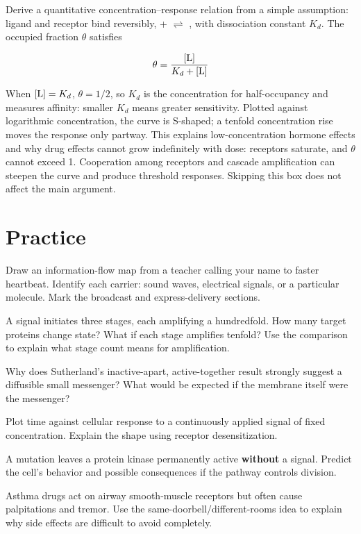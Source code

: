 \begin{tiaozhan}
Derive a quantitative concentration--response relation from a simple assumption: ligand  and receptor  bind reversibly,  +  $\rightleftharpoons$ , with dissociation constant $K_d$. The occupied fraction $\theta$ satisfies

\[\theta = \frac{[\mathrm{L}]}{K_d + [\mathrm{L}]}\]

When $[\mathrm{L}] = K_d$, $\theta = 1/2$, so $K_d$ is the concentration for half-occupancy and measures affinity: smaller $K_d$ means greater sensitivity. Plotted against logarithmic concentration, the curve is S-shaped; a tenfold concentration rise moves the response only partway. This explains low-concentration hormone effects and why drug effects cannot grow indefinitely with dose: receptors saturate, and $\theta$ cannot exceed 1. Cooperation among receptors and cascade amplification can steepen the curve and produce threshold responses. Skipping this box does not affect the main argument.
\end{tiaozhan}

\section*{Practice}

\begin{sikaoti}
\item Draw an information-flow map from a teacher calling your name to faster heartbeat. Identify each carrier: sound waves, electrical signals, or a particular molecule. Mark the broadcast and express-delivery sections.
\item A signal initiates three stages, each amplifying a hundredfold. How many target proteins change state? What if each stage amplifies tenfold? Use the comparison to explain what stage count means for amplification.
\item Why does Sutherland's inactive-apart, active-together result strongly suggest a diffusible small messenger? What would be expected if the membrane itself were the messenger?
\item Plot time against cellular response to a continuously applied signal of fixed concentration. Explain the shape using receptor desensitization.
\item A mutation leaves a protein kinase permanently active \textbf{without} a signal. Predict the cell's behavior and possible consequences if the pathway controls division.
\item Asthma drugs act on airway smooth-muscle receptors but often cause palpitations and tremor. Use the same-doorbell/different-rooms idea to explain why side effects are difficult to avoid completely.
\end{sikaoti}

